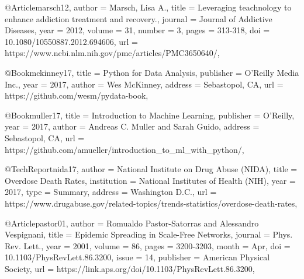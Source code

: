 @Article{marsch12,
  author  = {Marsch, Lisa A.},
  title   = {Leveraging teachnology to enhance addiction treatment and recovery.},
  journal = {Journal of Addictive Diseases},
  year    = {2012},
  volume  = {31},
  number  = {3},
  pages   = {313-318},
  doi     = {10.1080/10550887.2012.694606},
  url     = {https://www.ncbi.nlm.nih.gov/pmc/articles/PMC3650640/},
}

@Book{mckinney17,
  title     = {Python for Data Analysis},
  publisher = {O'Reilly Media Inc.},
  year      = {2017},
  author    = {Wes McKinney},
  address   = {Sebastopol, CA},
  url       = {https://github.com/wesm/pydata-book},
}


@Book{muller17,
  title     = {Introduction to Machine Learning},
  publisher = {O'Reilly},
  year      = {2017},
  author    = {Andreas C. Muller and Sarah Guido},
  address   = {Sebastopol, CA},
  url       = {https://github.com/amueller/introduction_to_ml_with_python/},
}




@TechReport{nida17,
  author      = {National Institute on Drug Abuse (NIDA)},
  title       = {Overdose Death Rates},
  institution = {National Institutes of Health (NIH)},
  year        = {2017},
  type        = {Summary},
  address     = {Washington D.C.},
  url         = {https://www.drugabuse.gov/related-topics/trends-statistics/overdose-death-rates},
}


@Article{pastor01,
  author    = {Romualdo Pastor-Satorras and Alessandro Vespignani},
  title     = {Epidemic Spreading in Scale-Free Networks},
  journal   = {Phys. Rev. Lett.},
  year      = {2001},
  volume    = {86},
  pages     = {3200-3203},
  month     = {Apr},
  doi       = {10.1103/PhysRevLett.86.3200},
  issue     = {14},
  publisher = {American Physical Society},
  url       = {https://link.aps.org/doi/10.1103/PhysRevLett.86.3200},
}


